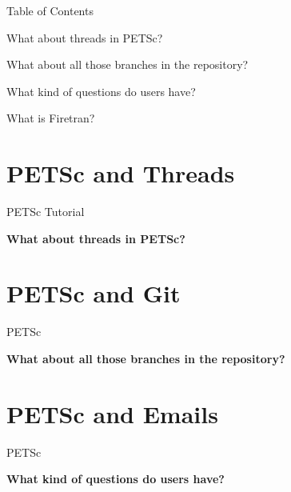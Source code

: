 


\begin{frame}{Table of Contents}
   \begin{block}{What about threads in PETSc?} \end{block}
   \begin{block}{What about all those branches in the repository?} \end{block}
   \begin{block}{What kind of questions do users have?} \end{block}
   \begin{block}{What is Firetran?} \end{block}
\end{frame}


%
%
\section{PETSc and Threads}

\begin{frame}{PETSc Tutorial}
   \begin{center} \Large \textbf{What about threads in PETSc?} \end{center}

\end{frame}





%
%
\section{PETSc and Git}

\begin{frame}{PETSc}
   \begin{center} \Large \textbf{What about all those branches in the repository?} \end{center}
\end{frame}





%
%
\section{PETSc and Emails}

\begin{frame}{PETSc}
   \begin{center} \Large \textbf{What kind of questions do users have?} \end{center}
\end{frame}


